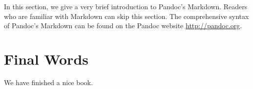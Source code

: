\documentclass[]{krantz}
\begin{document}
In this section, we give a very brief introduction to Pandoc's Markdown. Readers who are familiar with Markdown can skip this section. The comprehensive syntax of Pandoc's Markdown can be found on the Pandoc website \url{http://pandoc.org}.

\hypertarget{final-words}{%
\chapter{Final Words}\label{final-words}}

We have finished a nice book.



\printindex
\end{document}
